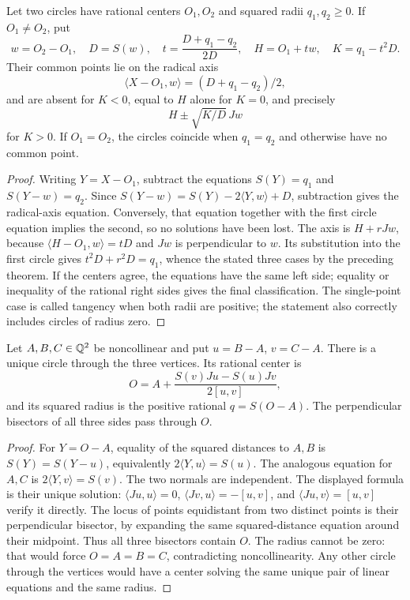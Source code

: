 \begin{theorem}
\label{geo:circle-circle}
Let two circles have rational centers $O_1,O_2$ and squared radii
$q_1,q_2\ge0$. If $O_1\ne O_2$, put
\[
 w=O_2-O_1,\quad D=S(w),\quad
 t=\frac{D+q_1-q_2}{2D},\quad H=O_1+tw,\quad K=q_1-t^2D.
\]
Their common points lie on the radical axis
\[
 \langle X-O_1,w\rangle=(D+q_1-q_2)/2,
\]
and are absent for $K<0$, equal to $H$ alone for $K=0$, and precisely
\[
 H\mathbin{\pm}\sqrt{K/D}\,Jw
\]
for $K>0$. If $O_1=O_2$, the circles coincide when $q_1=q_2$ and otherwise
have no common point.
\end{theorem}
\begin{proof}
Writing $Y=X-O_1$, subtract the equations $S(Y)=q_1$ and
$S(Y-w)=q_2$. Since $S(Y-w)=S(Y)-2\langle Y,w\rangle+D$, subtraction
gives the radical-axis equation. Conversely, that equation together with
the first circle equation implies the second, so no solutions have been
lost. The axis is $H+rJw$, because $\langle H-O_1,w\rangle=tD$ and
$Jw$ is perpendicular to $w$. Its substitution into the first circle gives
$t^2D+r^2D=q_1$, whence the stated three cases by the preceding theorem.
If the centers agree, the equations have the same left side; equality or
inequality of the rational right sides gives the final classification.
The single-point case is called tangency when both radii are positive;
the statement also correctly includes circles of radius zero.
\end{proof}

\begin{theorem}
\label{geo:circumcenter}
Let $A,B,C\in\mathbb Q^2$ be noncollinear and put $u=B-A$, $v=C-A$.
There is a unique circle through the three vertices. Its rational center is
\[
 O=A+\frac{S(v)Ju-S(u)Jv}{2[u,v]},
\]
and its squared radius is the positive rational $q=S(O-A)$.
The perpendicular bisectors of all three sides pass through $O$.
\end{theorem}
\begin{proof}
For $Y=O-A$, equality of the squared distances to $A,B$ is
$S(Y)=S(Y-u)$, equivalently $2\langle Y,u\rangle=S(u)$.
The analogous equation for $A,C$ is
$2\langle Y,v\rangle=S(v)$.
The two normals are independent. The displayed formula is their unique
solution: $\langle Ju,u\rangle=0$,
$\langle Jv,u\rangle=-[u,v]$, and
$\langle Ju,v\rangle=[u,v]$ verify it directly.
The locus of points equidistant from two distinct points is their
perpendicular bisector, by expanding the same squared-distance equation
around their midpoint. Thus all three bisectors contain $O$.
The radius cannot be zero: that would force $O=A=B=C$, contradicting
noncollinearity. Any other circle through the vertices would have a center
solving the same unique pair of linear equations and the same radius.
\end{proof}

